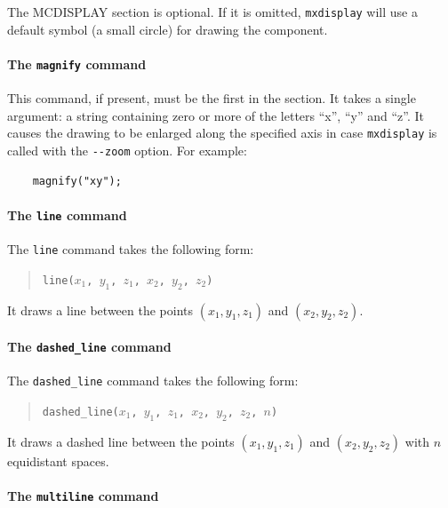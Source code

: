 The MCDISPLAY section is optional. If it is omitted, \verb+mxdisplay+
will use a default symbol (a small circle) for drawing the component.

\paragraph{The \texttt{magnify} command}

This command, if present, must be the first in the section. It takes a
single argument: a string containing zero or more of the letters ``x'',
``y'' and ``z''. It causes the drawing to be enlarged along the
specified axis in case \verb+mxdisplay+ is called with the \verb+--zoom+
option. For example:
\begin{verbatim}
    magnify("xy");
\end{verbatim}


\paragraph{The \texttt{line} command}

The \texttt{line} command takes the following form:
\begin{quote}
  \texttt{line($x_1$, $y_1$, $z_1$, $x_2$, $y_2$, $z_2$)}
\end{quote}
It draws a line between the points $(x_1, y_1, z_1)$ and $(x_2, y_2,
z_2)$.

\paragraph{The \texttt{dashed\_line} command}

The \texttt{dashed\_line} command takes the following form:
\begin{quote}
  \texttt{dashed\_line($x_1$, $y_1$, $z_1$, $x_2$, $y_2$, $z_2$, $n$)}
\end{quote}
It draws a dashed line between the points $(x_1, y_1, z_1)$ and $(x_2, y_2,
z_2)$ with $n$ equidistant spaces.


\paragraph{The \texttt{multiline} command}

